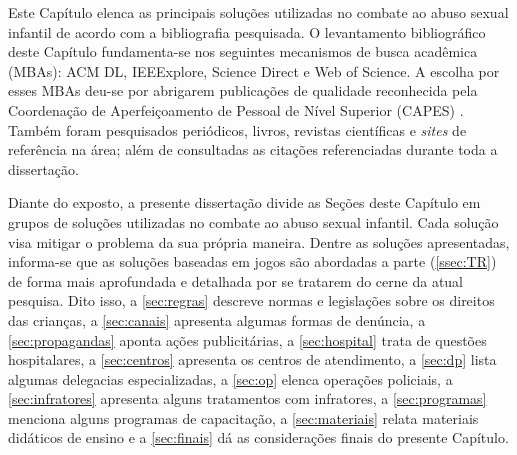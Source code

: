Este Capítulo elenca as principais soluções utilizadas no combate ao abuso sexual infantil de acordo com a bibliografia pesquisada. O levantamento bibliográfico deste Capítulo fundamenta-se nos seguintes mecanismos de busca acadêmica (MBAs): ACM DL, IEEExplore, Science Direct e Web of Science. A escolha por esses MBAs deu-se por abrigarem publicações de qualidade reconhecida pela Coordenação de Aperfeiçoamento de Pessoal de Nível Superior (CAPES) \cite{capes2016}%
. Também foram pesquisados periódicos, livros, revistas científicas e \textit{sites} de referência na área; além de consultadas as citações referenciadas durante toda a dissertação. 

Diante do exposto, a presente dissertação divide as Seções deste Capítulo em grupos de soluções utilizadas no combate ao abuso sexual infantil. Cada solução visa mitigar o problema da sua própria maneira. Dentre as soluções apresentadas, informa-se que as soluções baseadas em jogos são abordadas a parte (\autoref{ssec:TR}) de forma mais aprofundada e detalhada por se tratarem do cerne da atual pesquisa. Dito isso, a \autoref{sec:regras} descreve normas e legislações sobre os direitos das crianças, a \autoref{sec:canais} apresenta algumas formas de denúncia, a \autoref{sec:propagandas} aponta ações publicitárias, a \autoref{sec:hospital} trata de questões hospitalares, a \autoref{sec:centros} apresenta os centros de atendimento, a \autoref{sec:dp} lista algumas delegacias especializadas, a \autoref{sec:op} elenca operações policiais, a \autoref{sec:infratores} apresenta alguns tratamentos com infratores, a \autoref{sec:programas} menciona alguns programas de capacitação, a \autoref{sec:materiais} relata materiais didáticos de ensino e a \autoref{sec:finais} dá as considerações finais do presente Capítulo. 









